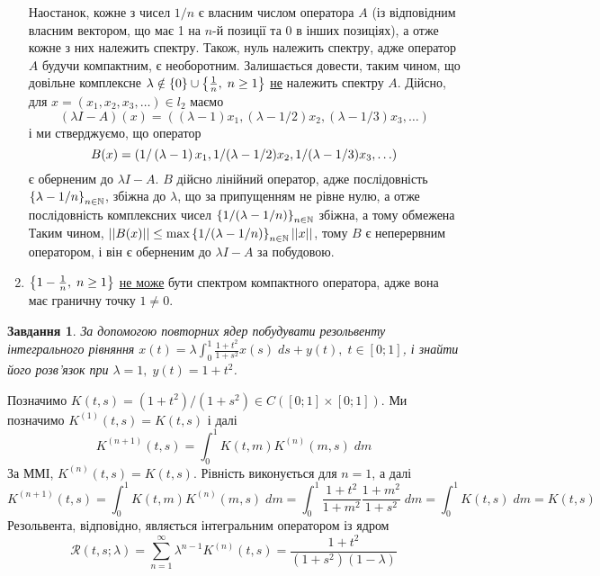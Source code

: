 \documentclass[10pt]{article}
\newtheorem{prob}{Завдання}
\newcommand{\ds}{\;ds}
\begin{document}
\begin{enumerate}
	Наостанок, кожне з чисел $1/n$ є власним числом оператора $A$ (із відповідним власним вектором, що має 1 на $n$-й позиції та 0 в інших
	позиціях), а отже кожне з них належить спектру. Також, нуль належить спектру, адже оператор $A$ будучи компактним, є необоротним. Залишається
	довести, таким чином, що довільне комплексне
	$\lambda\notin\left\{0\right\}\cup\left\{\frac{1}{n},\;n\geq1\right\}$ \uline{не} належить спектру $A$. Дійсно, для $x=(x_1,x_2,x_3,\hdots)\in l_2$
	маємо
	\[(\lambda I-A)(x)=((\lambda-1)x_1,(\lambda-1/2)x_2,(\lambda-1/3)x_3,\hdots)\]
	і ми стверджуємо, що оператор 
	\[B(x)=\left({1}/\left(\lambda-1\right)x_1,1/(\lambda-1/2)x_2,{1}/(\lambda-1/3)x_3,\hdots\right)\]
	є оберненим до $\lambda I-A$. $B$ дійсно лінійний оператор, адже послідовність $\left\{\lambda-1/n\right\}_{n\in\mathbb{N}}$, збіжна до $\lambda$,
	що за припущенням не рівне нулю, а отже послідовність комплексних чисел $\left\{1/(\lambda-1/n)\right\}_{n\in\mathbb{N}}$ збіжна, а тому обмежена
	Таким чином, $\mynorm{B(x)}\leq\max\mycbra{1/(\lambda-1/n)}_{n\in\mathbb{N}}\mynorm{x}$, тому $B$ є неперервним оператором, і він є оберненим
	до $\lambda I-A$ за побудовою.
\item $\left\{1-\frac{1}{n},\;n\geq1\right\}$ \uline{не може} бути спектром компактного оператора, адже вона має граничну точку $1\neq0$.
\end{enumerate}
\begin{prob}За допомогою повторних ядер побудувати резольвенту інтегрального рівняння $x(t)=\lambda\int_{0}^{1}\frac{1+t^2}{1+s^2}x(s)\ds+
	y(t),\;t\in[0;1]$, і знайти його розв’язок при $\lambda=1,\;y(t)=1+t^2$.\end{prob}
	\newcommand{\dm}{\;dm}
	Позначимо $K(t,s)=(1+t^2)/(1+s^2)\in C([0;1]\times[0;1])$. Ми позначимо $K^{(1)}(t,
	s)=K(t,s)$ і далі \[K^{(n+1)}(t,s)=\int_{0}^1 K(t,m)K^{(n)}(m,s)\;dm\]
	За ММІ, $K^{(n)}(t,s)=K(t,s)$. Рівність виконується для
	$n=1$, а далі
	\[K^{(n+1)}(t, s)=\int
	_{0}^1 K(t,m)K^{(n)}(m,s)\dm=\int_{0}^1\frac{1+t^2}{1+m^2}\frac{1+m^2}{1+s^2}\dm=\int_0^1K(t,s)\dm=K(t,s)\]
	Резольвента, відповідно, являється інтегральним оператором із ядром
	\[\mathcal{R}(t, s;\lambda)=\sum_{n=1}^\infty \lambda^{n-1}K^{(n)}(t, s)=\frac{1+t^2}{(1+s^2)(1-\lambda)}\]
\end{document}
